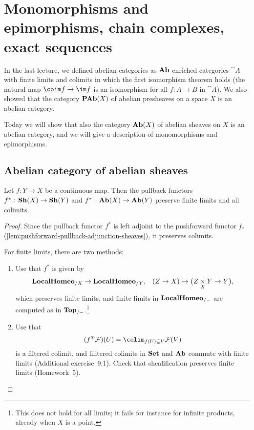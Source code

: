 \chapter{Monomorphisms and epimorphisms, chain complexes, exact sequences}

In the last lecture, we defined abelian categories as \(\mathbf{Ab}\)-enriched categories \(\cat A\) with finite limits and colimits in which the first isomorphism theorem holds (the natural map \(\coim f\to\im f\) is an isomorphism for all \(f\colon A\to B\) in \(\cat A\)).
We also showed that the category \(\operatorname{\mathbf{PAb}}(X)\) of abelian presheaves on a space \(X\) is an abelian category.

Today we will show that also the category \(\operatorname{\mathbf{Ab}}(X)\) of abelian sheaves on \(X\) is an abelian category, and we will give a description of monomorphisms and epimorphisms.

\section{Abelian category of abelian sheaves}

\begin{lem}\label{lem:pullback-preserves-colimits-and-finite-limits}
Let \(f\colon Y\to X\) be a continuous map.
Then the pullback functors \(f^*\colon\catSheaf(X)\to\catSheaf(Y)\) and \(f^*\colon\catAbelianSheaf(X)\to\catAbelianSheaf(Y)\) preserve finite limits and all colimits.
\end{lem}
\begin{proof}
Since the pullback functor \(f^*\) is left adjoint to the pushforward functor \(f_*\) (\cref{lem:pushforward-pullback-adjunction-sheaves}), it preserves colimits.

For finite limits, there are two methods:
\begin{enumerate}
\item Use that \(f^*\) is given by
  \[\catLocalHomeomorphism_{/X}\to\catLocalHomeomorphism_{/Y}\text{,} \quad (Z\to X) \mapsto \bigl(Z\pullback{X}Y\to Y\bigr)\text{,} \]
  which preserves finite limits, and finite limits in \(\mathbf{LocalHomeo}_{/-}\) are computed as in \(\mathbf{Top}_{/-}\).\footnote{This does not hold for all limits; it fails for instance for infinite products, already when \(X\) is a point.}
\item Use that
  \[(f^\circledast\mathcal F)(U) = \colim_{f(U)\subseteq V}\mathcal F(V) \]
  is a filtered colimit, and filitered colimits in \(\mathbf{Set}\) and \(\mathbf{Ab}\) commute with finite limits (Additional exercise~9.1).
  Check that sheafification preserves finite limits (Homework~5).
  \qedhere
\end{enumerate}
\end{proof}

